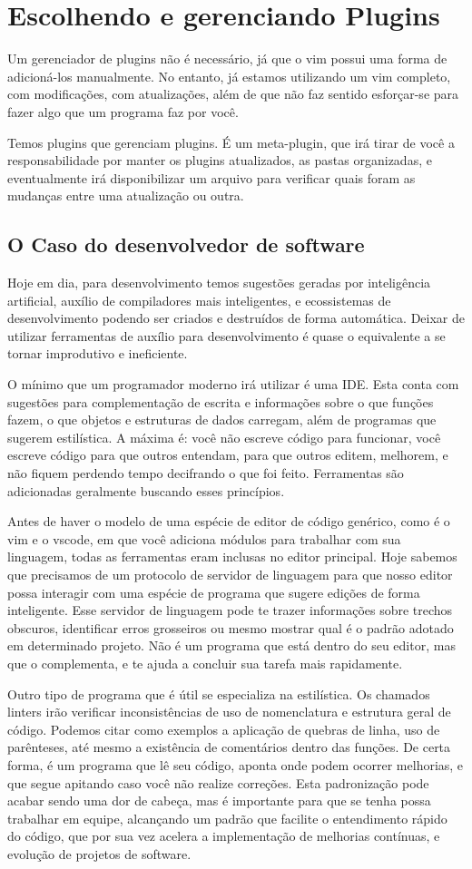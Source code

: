 \chapter{Escolhendo e gerenciando Plugins}
Um gerenciador de plugins não é necessário, já que o vim possui uma forma de adicioná-los manualmente.
No entanto, já estamos utilizando um vim completo, com modificações, com atualizações,
além de que não faz sentido esforçar-se para fazer algo que um programa faz por você.

Temos plugins que gerenciam plugins.
É um meta-plugin, que irá tirar de você a responsabilidade por manter os plugins atualizados,
as pastas organizadas, e eventualmente irá disponibilizar um arquivo para verificar quais foram
as mudanças entre uma atualização ou outra.
\section{O Caso do desenvolvedor de software}
Hoje em dia, para desenvolvimento temos sugestões geradas por inteligência artificial,
auxílio de compiladores mais inteligentes,
e ecossistemas de desenvolvimento podendo ser criados e destruídos de forma automática.
Deixar de utilizar ferramentas de auxílio para desenvolvimento é quase o equivalente a se tornar
improdutivo e ineficiente.

O mínimo que um programador moderno irá utilizar é uma IDE. Esta conta com sugestões para complementação
de escrita e informações sobre o que funções fazem, o que objetos e estruturas de dados carregam, além
de programas que sugerem estilística.
A máxima é: você não escreve código para funcionar, você escreve código para que outros entendam,
para que outros editem, melhorem, e não fiquem perdendo tempo decifrando o que foi feito.
Ferramentas são adicionadas geralmente buscando esses princípios.

Antes de haver o modelo de uma espécie de editor de código genérico, como é o vim e o vscode,
em que você adiciona módulos para trabalhar com sua linguagem, todas as ferramentas eram
inclusas no editor principal.
Hoje sabemos que precisamos de um protocolo de servidor de linguagem para que nosso editor possa
interagir com uma espécie de programa que sugere edições de forma inteligente.
Esse servidor de linguagem pode te trazer informações sobre trechos obscuros, identificar erros grosseiros
ou mesmo mostrar qual é o padrão adotado em determinado projeto.
Não é um programa que está dentro do seu editor, mas que o complementa,
e te ajuda a concluir sua tarefa mais rapidamente.

Outro tipo de programa que é útil se especializa na estilística.
Os chamados linters irão verificar inconsistências de uso de nomenclatura e
estrutura geral de código. Podemos citar como exemplos a aplicação de quebras de linha, uso de parênteses,
até mesmo a existência de comentários dentro das funções.
De certa forma, é um programa que lê seu código, aponta onde podem ocorrer melhorias, e que segue apitando
caso você não realize correções.
Esta padronização pode acabar sendo uma dor de cabeça, mas é importante para que se tenha possa trabalhar em equipe,
alcançando um padrão que facilite o entendimento rápido do código, que por sua vez acelera a implementação de melhorias
contínuas, e evolução de projetos de software.
\newpage
